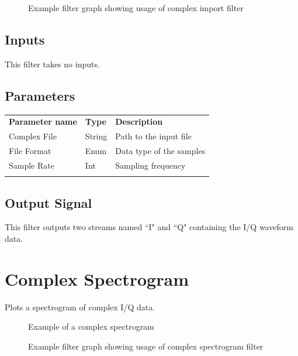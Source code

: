 \begin{figure}[h]
\centering
{}
\caption{Example filter graph showing usage of complex import filter}
\label{filter_compleximport_graph}
\end{figure}

\FloatBarrier

\subsection{Inputs}

This filter takes no inputs.

\subsection{Parameters}

\begin{tabularx}{16cm}{llX}
\thickhline
\textbf{Parameter name} & \textbf{Type} & \textbf{Description} \\
\thickhline
Complex File & String & Path to the input file\\
\thinhline
File Format & Enum & Data type of the samples\\
\thinhline
Sample Rate & Int & Sampling frequency\\
\thickhline
\end{tabularx}

\subsection{Output Signal}

This filter outputs two streams named ``I" and ``Q" containing the I/Q waveform data.

\pagebreak
\section{Complex Spectrogram}

Plots a spectrogram of complex I/Q data.

\begin{figure}[h]
\centering
{}
\caption{Example of a complex spectrogram}
\label{filter_complexspectrogram}
\end{figure}

\begin{figure}[h]
\centering
{}
\caption{Example filter graph showing usage of complex spectrogram filter}
\label{filter_complexspectrogram_graph}
\end{figure}


